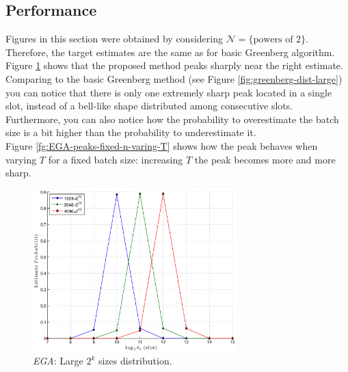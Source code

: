 \documentclass[11pt,a4paper,twoside,openright]{book}
\begin{document}
\subsection{Performance}
Figures in this section were obtained by considering $\mathcal{N}=\{\textrm{powers of 2}\}$. Therefore, the target estimates are the same as for basic Greenberg algorithm.\\
Figure \ref{fg:EGA-sharp-peaks} shows that the proposed method peaks sharply near the right estimate. Comparing to the basic Greenberg method (see Figure \ref{fig:greenberg-dist-large}) you can notice that there is only one extremely sharp peak located in a single slot, instead of a bell-like shape distributed among consecutive slots. Furthermore, you can also notice how the probability to overestimate the batch size is a bit higher than the probability to underestimate it.\\
Figure \ref{fg:EGA-peaks-fixed-n-varing-T} shows how the peak behaves when varying $T$ for a fixed batch size: increasing $T$ the peak becomes more and more sharp.

\begin{figure}[H]
\begin{center}
\includegraphics[width=0.7\textwidth]{matlab/Greenberg_MLE/greenberg-mle-T20}
\caption{\emph{EGA}:  Large $2^{k}$ sizes distribution.}
\label{fg:EGA-sharp-peaks}
\end{center}
\end{figure}
\end{document}
